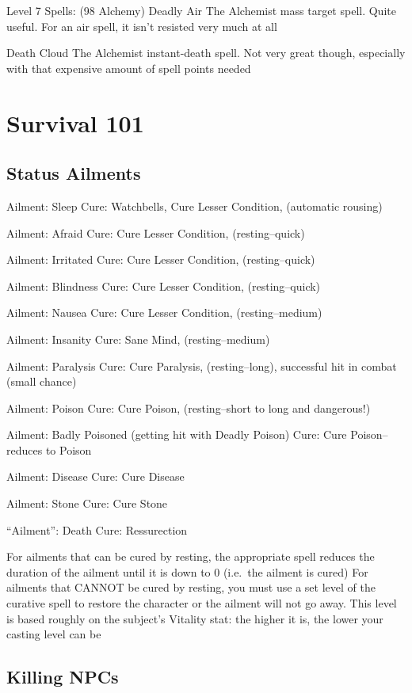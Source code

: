 \documentclass[12pt]{article}
\begin{document}
Level 7 Spells: (98 Alchemy) Deadly Air The Alchemist mass target spell.
Quite useful. For an air spell, it isn't resisted very much at all

Death Cloud The Alchemist instant-death spell. Not very great though,
especially with that expensive amount of spell points needed

\section{Survival 101}\label{survival-101}

\subsection{Status Ailments}\label{status-ailments}

Ailment: Sleep Cure: Watchbells, Cure Lesser Condition, (automatic
rousing)

Ailment: Afraid Cure: Cure Lesser Condition, (resting--quick)

Ailment: Irritated Cure: Cure Lesser Condition, (resting--quick)

Ailment: Blindness Cure: Cure Lesser Condition, (resting--quick)

Ailment: Nausea Cure: Cure Lesser Condition, (resting--medium)

Ailment: Insanity Cure: Sane Mind, (resting--medium)

Ailment: Paralysis Cure: Cure Paralysis, (resting--long), successful hit
in combat (small chance)

Ailment: Poison Cure: Cure Poison, (resting--short to long and
dangerous!)

Ailment: Badly Poisoned (getting hit with Deadly Poison) Cure: Cure
Poison--reduces to Poison

Ailment: Disease Cure: Cure Disease

Ailment: Stone Cure: Cure Stone

``Ailment'': Death Cure: Ressurection

For ailments that can be cured by resting, the appropriate spell reduces
the duration of the ailment until it is down to 0 (i.e.~the ailment is
cured) For ailments that CANNOT be cured by resting, you must use a set
level of the curative spell to restore the character or the ailment will
not go away. This level is based roughly on the subject's Vitality stat:
the higher it is, the lower your casting level can be

\subsection{Killing NPCs}\label{killing-npcs}
\end{document}
